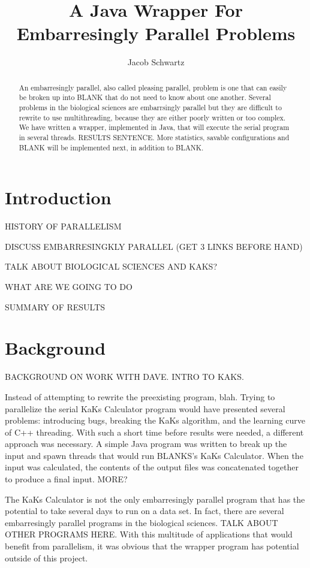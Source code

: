 \documentclass[12pt]{article}
\begin{document}
\title{A Java Wrapper For Embarresingly Parallel Problems}
\author{Jacob Schwartz}
\maketitle

\begin{abstract}
An embarresingly parallel, also called pleasing parallel, problem is one that 
can easily be broken up into BLANK that do not need to know about one another.
Several problems in the biological sciences are embarrsingly parallel but they
are difficult to rewrite to use multithreading, because they are either poorly
written or too complex. We have written a wrapper, implemented in Java, that
will execute the serial program in several threads. RESULTS SENTENCE. More
statistics, savable configurations and BLANK will be implemented next, in
addition to BLANK.
\end{abstract}


\section{Introduction}

HISTORY OF PARALLELISM

DISCUSS EMBARRESINGKLY PARALLEL (GET 3 LINKS BEFORE HAND)

TALK ABOUT BIOLOGICAL SCIENCES AND KAKS?

WHAT ARE WE GOING TO DO

SUMMARY OF RESULTS

\section{Background}

BACKGROUND ON WORK WITH DAVE. INTRO TO KAKS.

Instead of attempting to rewrite the preexisting program, blah. Trying to
parallelize the serial KaKs Calculator program would have presented several
problems: introducing bugs, breaking the KaKs algorithm, and the learning curve
of C++ threading. With such a short time before results were needed, a different
approach was necessary. A simple Java program was written to break up the input
and spawn threads that would run BLANKS's KaKs Calculator. When the input was
calculated, the contents of the output files was concatenated together to
produce a final input. MORE?

The KaKs Calculator is not the only embarresingly parallel program that has the
potential to take several days to run on a data set. In fact, there are several
embarresingly parallel programs in the biological sciences. TALK ABOUT OTHER
PROGRAMS HERE. With this multitude of applications that would benefit from
parallelism, it was obvious that the wrapper program has potential outside of
this project.
\end{document}
